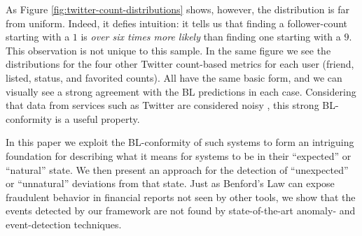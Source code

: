\documentclass[twoside,leqno,twocolumn]{article}\usepackage[]{graphicx}\usepackage[]{color}
\begin{document}
As Figure \ref{fig:twitter-count-distributions} shows, however, the distribution is far from uniform. Indeed, it defies intuition: it tells us that finding a follower-count starting with a $1$ is \textit{over six times more likely} than finding one starting with a $9$. This observation is not unique to this sample. In the same figure we see the distributions for the four other Twitter count-based metrics for each user (friend, listed, status, and favorited counts). All have the same basic form, and we can visually see a strong agreement with the BL predictions in each case. Considering that data from services such as Twitter are considered noisy \cite{antoine2015portraying, hayashi2015real}, this strong BL-conformity is a useful property.


In this paper we exploit the BL-conformity of such systems to form an intriguing foundation for describing what it means for systems to be in their ``expected'' or  ``natural'' state. We then present an approach for the detection of ``unexpected'' or  ``unnatural'' deviations from that state. Just as Benford's Law can expose fraudulent behavior in financial reports not seen by other tools, we show that the events detected by our framework are not found by state-of-the-art anomaly- and event-detection techniques. \newline
\end{document}
